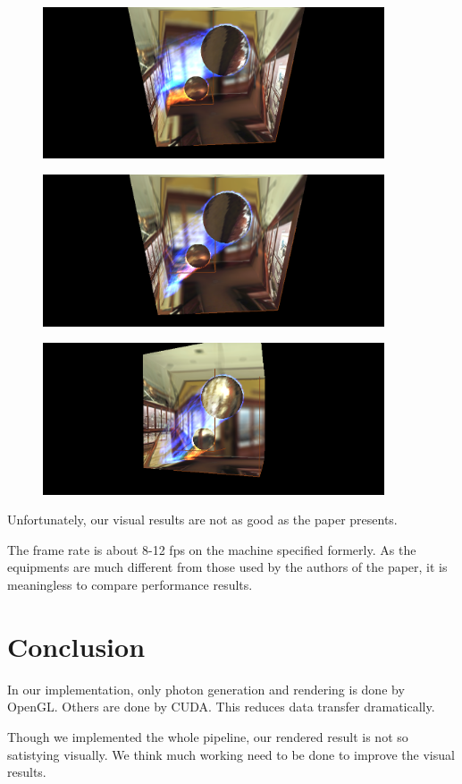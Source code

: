 \documentclass[a4paper]{article}
\begin{document}
\begin{CJK*}{UTF8}{gkai}
\begin{figure}[H]
\centering
\includegraphics[width=0.9\textwidth]{ball3.png}
\caption{\label{fig:ball3}}
\end{figure}

\begin{figure}[H]
\centering
\includegraphics[width=0.9\textwidth]{ball4.png}
\caption{\label{fig:ball4}}
\end{figure}

\begin{figure}[H]
\centering
\includegraphics[width=0.9\textwidth]{ball5.png}
\caption{\label{fig:ball5}}
\end{figure}


Unfortunately, our visual results are not as good as the paper presents.

The frame rate is about 8-12 fps on the machine specified formerly. As the equipments are much different from those used by the authors of the paper, it is meaningless to compare performance results.

\section{Conclusion}
In our implementation, only photon generation and rendering is done by OpenGL. Others are done by CUDA. This reduces data transfer dramatically.

Though we implemented the whole pipeline, our rendered result is not so satistying visually. We think much working need to be done to improve the visual results.

\end{CJK*}


 


\label{page:EndofDoc}
\end{document}

